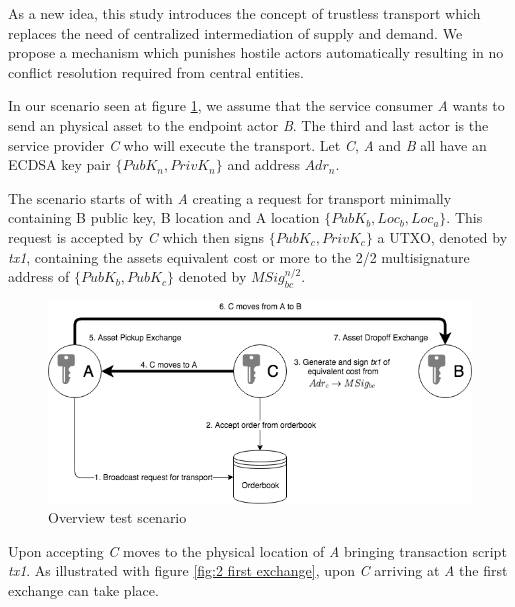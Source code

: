 As a new idea, this study introduces the concept of trustless transport which replaces the need of centralized intermediation of supply and demand. We propose a mechanism which punishes hostile actors automatically resulting in no conflict resolution required from central entities. \par
In our scenario seen at figure \ref{fig:1 main overview}, we assume that the service consumer \textit{A} wants to send an physical asset to the endpoint actor \textit{B}. The third and last actor is the service provider \textit{C} who will execute the transport. Let \textit{C}, \textit{A} and \textit{B} all have an ECDSA key pair \(\{PubK_n, PrivK_n\}\) and address \(Adr_n\). \par
The scenario starts of with \textit{A} creating a request for transport minimally containing B public key, B location and A location \(\{PubK_b, Loc_b, Loc_a\}\). This request is accepted by \textit{C} which then signs \(\{PubK_c, PrivK_c\}\) a UTXO, denoted by \textit{tx1}, containing the assets equivalent cost or more to the 2/2 multisignature address of \(\{PubK_b, PubK_c\}\) denoted by \(MSig_{bc}^{n/2}\). \par

\begin{figure}[h]
\centering
\includegraphics[width=1\textwidth]{images/main.png}
\caption{Overview test scenario}
\label{fig:1 main overview}
\end{figure}

Upon accepting \textit{C} moves to the physical location of \textit{A} bringing transaction script \textit{tx1}. As illustrated with figure \ref{fig:2 first exchange}, upon \textit{C} arriving at \textit{A} the first exchange can take place. \par

